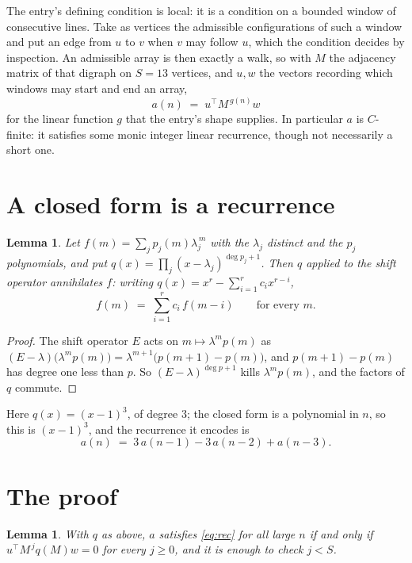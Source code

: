 \documentclass[11pt,a4paper]{article}
\theoremstyle{plain}
\newtheorem{lemma}[theorem]{Lemma}
\theoremstyle{definition}
\begin{document}
The entry's defining condition is local: it is a condition on a bounded window of consecutive lines. Take as vertices the
admissible configurations of such a window and put an edge from $u$ to $v$ when $v$ may
follow $u$, which the condition decides by inspection. An admissible array is then exactly a
walk, so with $M$ the adjacency matrix of that digraph on $S=13$ vertices, and $u,w$ the
vectors recording which windows may start and end an array,
\[
a(n)\;=\;u^{\!\top}M^{\,g(n)}w
\]
for the linear function $g$ that the entry's shape supplies. In particular $a$ is
$C$-finite: it satisfies some monic integer linear recurrence, though not necessarily a short
one.

\section{A closed form is a recurrence}

\begin{lemma}\label{lem:ann}
Let $f(m)=\sum_{j}p_j(m)\lambda_j^{\,m}$ with the $\lambda_j$ distinct and the $p_j$
polynomials, and put $q(x)=\prod_j(x-\lambda_j)^{\deg p_j+1}$. Then $q$ applied to the shift
operator annihilates $f$: writing $q(x)=x^{r}-\sum_{i=1}^{r}c_ix^{r-i}$,
\[
f(m)\;=\;\sum_{i=1}^{r}c_i\,f(m-i)\qquad\text{for every }m.
\]
\end{lemma}

\begin{proof}
The shift operator $E$ acts on $m\mapsto\lambda^{m}p(m)$ as
$(E-\lambda)\bigl(\lambda^{m}p(m)\bigr)=\lambda^{m+1}\bigl(p(m+1)-p(m)\bigr)$, and
$p(m+1)-p(m)$ has degree one less than $p$. So $(E-\lambda)^{\deg p+1}$ kills
$\lambda^{m}p(m)$, and the factors of $q$ commute.
\end{proof}

Here $q(x)=(x-1)^{3}$, of degree $3$; the closed form is a polynomial in $n$, so this is $(x-1)^{3}$, and the recurrence it encodes is
\begin{equation}\label{eq:rec}
a(n)\;=\;3\,a(n-1) - 3\,a(n-2) + a(n-3).
\end{equation}

\section{The proof}

\begin{lemma}\label{lem:crit}
With $q$ as above, $a$ satisfies \eqref{eq:rec} for all large $n$ if and only if
$u^{\!\top}M^{\,j}q(M)w=0$ for every $j\ge0$, and it is enough to check $j<S$.
\end{lemma}
\end{document}

